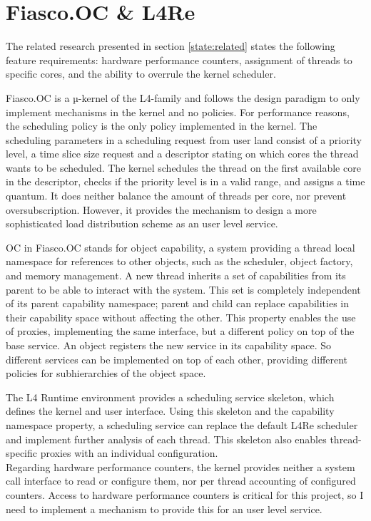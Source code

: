 \section{Fiasco.OC \& L4Re}
\label{state:env}
The related research presented in section \ref{state:related} states the
following feature requirements:
hardware performance counters, assignment of threads to specific
cores, and the ability to overrule the kernel scheduler.

Fiasco.OC is a µ-kernel of the L4-family and follows the design paradigm to
only implement mechanisms in the kernel and no policies.
For performance reasons, the scheduling policy is the only policy implemented in
the kernel.
The scheduling parameters in a scheduling request from user land consist of
a priority level, a time slice size request and a descriptor stating on which
cores the thread wants to be scheduled.
The kernel schedules the thread on the first available core in the descriptor,
checks if the priority level is in a valid range, and assigns a time
quantum.
It does neither balance the amount of threads per core, nor prevent
oversubscription.
However, it provides the mechanism to design a more sophisticated load
distribution scheme as an user level service.

OC in Fiasco.OC stands for object capability, a system providing a thread local
namespace for references to other objects, such as the scheduler, object
factory, and memory management.
A new thread inherits a set of capabilities from its parent to be able to
interact with the system.
This set is completely independent of its parent capability namespace; parent
and child can replace capabilities in their capability space without affecting
the other.
This property enables the use of proxies, implementing the same interface, but
a different policy on top of the base service.
An object registers the new service in its capability space.
So different services can be implemented on top of each other, providing
different policies for subhierarchies of the object space.


The L4 Runtime environment provides a scheduling service skeleton, which
defines the kernel and user interface.
Using this skeleton and the capability namespace property, a scheduling service
can replace the default L4Re scheduler and implement further analysis of each
thread.
This skeleton also enables thread-specific proxies with an individual
configuration.
\\

Regarding hardware performance counters, the kernel provides neither a system
call interface to read or configure them, nor per thread accounting of
configured counters.
Access to hardware performance counters is critical for this project, so I need
to implement a mechanism to provide this for an user level service.



